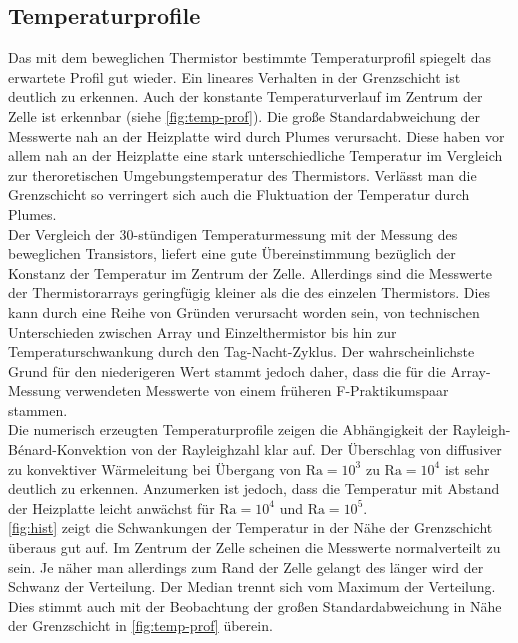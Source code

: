 \subsection{Temperaturprofile}
Das mit dem beweglichen Thermistor bestimmte Temperaturprofil spiegelt das erwartete Profil gut wieder.
Ein lineares Verhalten in der Grenzschicht ist deutlich zu erkennen. Auch der konstante Temperaturverlauf im Zentrum der Zelle ist erkennbar (siehe \cref{fig:temp-prof}).
Die große Standardabweichung der Messwerte nah an der Heizplatte wird durch Plumes verursacht. 
Diese haben vor allem nah an der Heizplatte eine stark unterschiedliche Temperatur im Vergleich zur theroretischen Umgebungstemperatur des Thermistors.
Verlässt man die Grenzschicht so verringert sich auch die Fluktuation der Temperatur durch Plumes.
\\
Der Vergleich der 30-stündigen Temperaturmessung mit der Messung des beweglichen Transistors, liefert eine gute Übereinstimmung bezüglich der Konstanz der Temperatur im Zentrum der Zelle.
Allerdings sind die Messwerte der Thermistorarrays geringfügig kleiner als die des einzelen Thermistors. 
Dies kann durch eine Reihe von Gründen verursacht worden sein, von technischen Unterschieden zwischen Array und Einzelthermistor bis hin zur Temperaturschwankung durch den Tag-Nacht-Zyklus.
Der wahrscheinlichste Grund für den niederigeren Wert stammt jedoch daher, dass die für die Array-Messung verwendeten Messwerte von einem früheren F-Praktikumspaar stammen.
\\
Die numerisch erzeugten Temperaturprofile zeigen die Abhängigkeit der Rayleigh-B\'enard-Konvektion von der Rayleighzahl klar auf. 
Der Überschlag von diffusiver zu konvektiver Wärmeleitung bei Übergang von $\text{Ra}=10^3$ zu $\text{Ra}=10^4$ ist sehr deutlich zu erkennen.
Anzumerken ist jedoch, dass die Temperatur mit Abstand der Heizplatte leicht anwächst für $\text{Ra} = 10^4$ und $\text{Ra} = 10^5$.
\\
\cref{fig:hist} zeigt die Schwankungen der Temperatur in der Nähe der Grenzschicht überaus gut auf. Im Zentrum der Zelle scheinen die Messwerte normalverteilt zu sein. Je näher man allerdings zum Rand der Zelle gelangt des länger wird der Schwanz der Verteilung. Der Median trennt sich vom Maximum der Verteilung. 
Dies stimmt auch mit der Beobachtung der großen Standardabweichung in Nähe der Grenzschicht in \cref{fig:temp-prof} überein.

